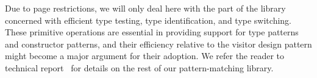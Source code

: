 Due to page restrictions, we will only deal here with the part of the library 
concerned with efficient type testing, type identification, and type switching. 
These primitive operations are essential in providing support for type patterns 
and constructor patterns, and their efficiency relative to the visitor design 
pattern might become a major argument for their adoption. We refer the reader to 
technical report~\cite{TR} for details on the rest of our pattern-matching 
library.

